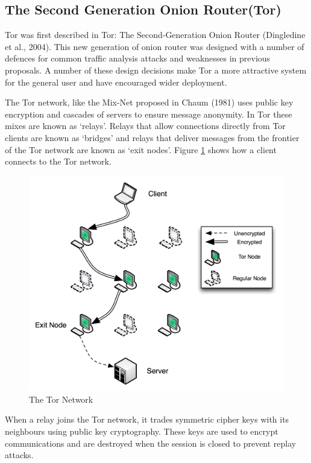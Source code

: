 \documentclass{ecuthesis}
\begin{document}
\subsection{The Second Generation Onion Router(Tor)}

Tor was first described in Tor: The Second-Generation Onion Router (Dingledine et al., 2004). This new generation of onion router was designed with a number of defences for common traffic analysis attacks and weaknesses in previous proposals. A number of these design decisions make Tor a more attractive system for the general user and have encouraged wider deployment.

The Tor network, like the Mix-Net proposed in Chaum (1981) uses public key encryption and cascades of servers to ensure message anonymity. In Tor these mixes are known as ‘relays’. Relays that allow connections directly from Tor clients are known as ‘bridges’ and relays that deliver messages from the frontier of the Tor network are known as ‘exit nodes’. Figure \ref{tor-network} shows how a client connects to the Tor network.

\begin{figure}[H]
\center \includegraphics[width=\linewidth]{tor-network-diagram}
\caption{The Tor Network}
\label{tor-network}
\end{figure}

When a relay joins the Tor network, it trades symmetric cipher keys with its neighbours using public key cryptography. These keys are used to encrypt communications and are destroyed when the session is closed to prevent replay attacks.
\end{document}
